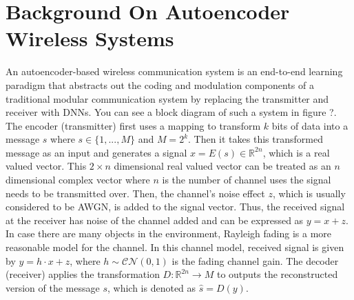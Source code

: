 \section{Background On Autoencoder Wireless Systems}
\label{s:background}
An autoencoder-based wireless communication system is an end-to-end learning paradigm that abstracts out the coding and modulation components of a  traditional modular communication system by replacing the transmitter and receiver with DNNs. You can see a block diagram of such a system in figure ?. The encoder (transmitter) first uses a mapping to transform \(k\) bits of data into a message \(s\) where \(s \in \{1,...,M\}\) and \(M = 2^k\). Then it takes this transformed message as an input and generates a signal \(x = E(s) \in \mathbb{R}^{2n}\), which is a real valued vector. This \(2 \times n\) dimensional real valued vector can be treated as an \(n\) dimensional complex vector where \(n\) is the number of channel uses the signal needs to be transmitted over. Then, the channel's noise effect \(z\), which is usually considered to be AWGN, is added to the signal vector. Thus, the received signal at the receiver has noise of the channel added and can be expressed as \(y = x + z\). In case there are many objects in the environment, Rayleigh fading is a more reasonable model for the channel. In this channel model, received signal is given by \(y = h \cdot x + z\), where \(h \sim \mathcal{CN}(0, 1)\) is the fading channel gain. The decoder (receiver) applies the transformation \(D: \mathbb{R}^{2n} \rightarrow M \) to outputs the reconstructed version of the message \(s\), which is denoted as \(\hat{s} = D(y)\).
